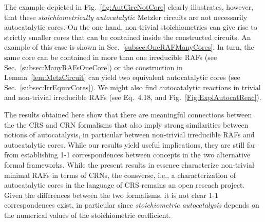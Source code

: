\documentclass[pdflatex]{sn-jnl}
\theoremstyle{thmstyleone}%
\theoremstyle{examplesty}%
\theoremstyle{thmstylethree}%
\newcommand{\PFS}[1]{\begingroup\color{cyan}#1\endgroup}
\begin{document}
The example depicted in Fig.~\ref{fig:AutCircNotCore} clearly illustrates,
however, that these \emph{stoichiometrically autocatalytic} Metzler
circuits are not necessarily autocatalytic cores. On the one hand,
non-trivial stoichiometries can give rise to strictly smaller cores that
can be contained inside the constructed circuits. An example of this case
is shown in Sec.~\ref{subsec:OneRAFManyCores}. In turn, \PFS{the same} core
can be contained in \PFS{more than one} irreducible RAFs (see
Sec.~\ref{subsec:ManyRAFsOneCore}) or the construction in
Lemma~\ref{lem:MetzCircuit} can yield two equivalent autocatalytic cores
(see Sec.~\ref{subsec:IrrEquivCores}). We might also find autocatalytic
reactions in trivial and non-trivial irreducible RAFs (see Eq.~4.18,
\cite{golnik_bridging_2026} and Fig.~\ref{Fig:ExplAutocatReac}).


\PFS{The results obtained here show that there are meaningful connections
  between the the CRS and CRN formalisms that also imply strong
  similarities between notions of autocatalysis, in particular between
  non-trivial irreducible RAFs and autocatalytic cores. While our results
  yield useful implications, they are still far from establishing 1-1
  correspondences between concepts in the two alternative formal
  frameworks. While the present results in essence characterize non-trivial
  minimal RAFs in terms of CRNs, the consverse, i.e., a characterization of
  autocatalytic cores in the language of CRS remains an open reseach
  project. Given the differences between the two formalisms, it is not
  clear 1-1 correspondences exist, in particular since \emph{stoichiometric
    autocatalysis} depends on the numerical values of the stoichiometric
  coefficient.}


\end{document}
